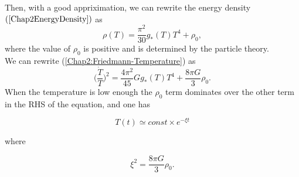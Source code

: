 \documentclass[11pt,a4paper,twoside]{book}
\begin{document}
Then, with a good appriximation, we can rewrite the energy density $ (\ref{Chap2EnergyDensity}) $ as 
\begin{equation}
	\label{Chap2:NewEnergyDensity}
	\rho(T)=\frac{\pi^{2}}{30}g_{*}(T)T^{4} + \rho_{0},
\end{equation}
where the value of $ \rho_{0} $ is positive and is determined by the particle theory.\\
We can rewrite (\ref{Chap2:Friedmann-Temperature}) as
\begin{equation}
\label{Chap2:Temperature-EnergydensityModified}
\Big(\frac{\dot{T}}{T}\Big)^{2}=\frac{4\pi^{2}}{45}Gg_{*}(T)T^{4}+\frac{8\pi G}{3}\rho_{0}.
\end{equation}
When the temperature is low enough the $ \rho_{0} $ term dominates over the other term in the RHS of the equation, and one has

\begin{equation}
	T(t)\simeq const \times e^{-\xi t}
\end{equation} 

where 

\begin{equation}
	\label{Chap2:psi}
	\xi^{2} =\frac{8\pi G}{3}\rho_{0}.
\end{equation}
\end{document}
